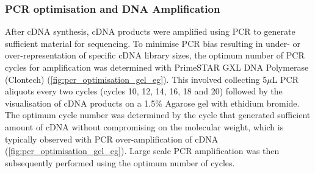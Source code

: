 \clearpage
\subsubsection{PCR optimisation and DNA Amplification}\label{ch: pcr_optimisation}
After cDNA synthesis, cDNA products were amplified using PCR to generate sufficient material for sequencing. To minimise PCR bias resulting in under- or over-representation of specific cDNA library sizes, the optimum number of PCR cycles for amplification was determined with PrimeSTAR GXL DNA Polymerase (Clontech) (\cref{fig:pcr_optimisation_gel_eg}). This involved collecting 5$\mu$L PCR aliquots every two cycles (cycles 10, 12, 14, 16, 18 and 20) followed by the visualisation of cDNA products on a 1.5\% Agarose gel with ethidium bromide. The optimum cycle number was determined by the cycle that generated sufficient amount of cDNA without compromising on the molecular weight, which is typically observed with PCR over-amplification of cDNA (\cref{fig:pcr_optimisation_gel_eg}). Large scale PCR amplification was then subsequently performed using the optimum number of cycles. 

